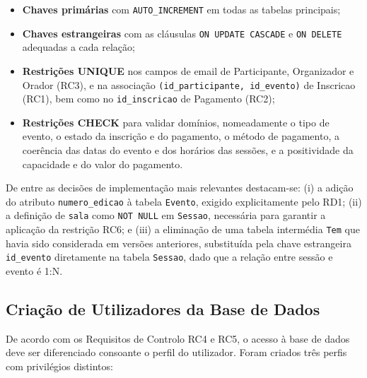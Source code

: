 \documentclass[runningheads]{llncs}
\begin{document}
                \begin{itemize}
                    \item \textbf{Chaves primárias} com \texttt{AUTO\_INCREMENT} em todas as tabelas principais;
                    \item \textbf{Chaves estrangeiras} com as cláusulas \texttt{ON UPDATE CASCADE} e \texttt{ON DELETE} adequadas a cada relação;
                    \item \textbf{Restrições UNIQUE} nos campos de email de Participante, Organizador e Orador (RC3), e na associação \texttt{(id\_participante, id\_evento)} de Inscricao (RC1), bem como no \texttt{id\_inscricao} de Pagamento (RC2);
                    \item \textbf{Restrições CHECK} para validar domínios, nomeadamente o tipo de evento, o estado da inscrição e do pagamento, o método de pagamento, a coerência das datas do evento e dos horários das sessões, e a positividade da capacidade e do valor do pagamento.
                \end{itemize}

                De entre as decisões de implementação mais relevantes destacam-se: (i) a adição do atributo \texttt{numero\_edicao} à tabela \texttt{Evento}, exigido explicitamente pelo RD1; (ii) a definição de \texttt{sala} como \texttt{NOT NULL} em \texttt{Sessao}, necessária para garantir a aplicação da restrição RC6; e (iii) a eliminação de uma tabela intermédia \texttt{Tem} que havia sido considerada em versões anteriores, substituída pela chave estrangeira \texttt{id\_evento} diretamente na tabela \texttt{Sessao}, dado que a relação entre sessão e evento é 1:N.

                \subsection{Criação de Utilizadores da Base de Dados}

                De acordo com os Requisitos de Controlo RC4 e RC5, o acesso à base de dados deve ser diferenciado consoante o perfil do utilizador. Foram criados três perfis com privilégios distintos:
\end{document}
